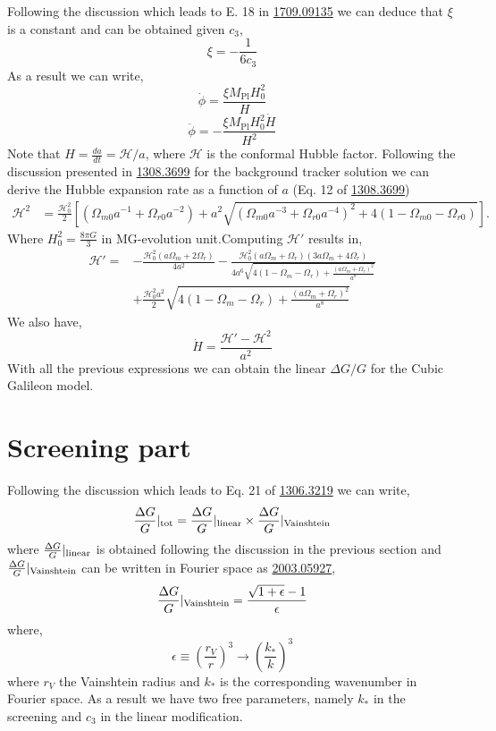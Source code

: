 \documentclass{article}
\def\be{\begin{equation}}
\def\ee{\end{equation}}
\begin{document}
Following the discussion which leads to E. 18 in \href{https://arxiv.org/pdf/1709.09135.pdf} {1709.09135} we can deduce that $\xi$ is a constant and can be obtained given $c_3$,
\be
\xi = -\frac{1}{6 c_3}
\ee
As a result we can write,
\be
\dot{\phi} =   \frac{\xi M_{\mathrm{Pl}} H_0^2}{H} 
\ee
\be
\ddot{\phi} =  - \frac{\xi M_{\mathrm{Pl}} H_0^2 \dot{H}}{H^2} 
\ee
Note that $H = \frac{d a}{dt} = \mathcal{H}/a$, where $\mathcal{H}$ is the conformal Hubble factor. Following the discussion presented in \href{https://arxiv.org/pdf/1308.3699.pdf}{1308.3699} for the background tracker solution we can derive the Hubble expansion rate as a function of $a$ (Eq. 12 of \href{https://arxiv.org/pdf/1308.3699.pdf}{1308.3699})
\begin{equation}
\begin{aligned}
\mathcal{H}^2 &= \frac{\mathcal{H}_0^2}{2}\left[\left(\Omega_{m0} a^{-1} + \Omega_{r0} a^{-2}\right) + a^2 \sqrt{\left(\Omega_{m0} a^{-3} + \Omega_{r0} a^{-4}\right)^2 + 4\left(1 - \Omega_{m0} - \Omega_{r0}\right)}\right].
\end{aligned}
\end{equation}
Where $H_0^2 = \frac{8 \pi G}{3}$ in MG-evolution unit.Computing $\mathcal{H}'$ results in,
\begin{equation}
\begin{aligned}
\mathcal{H}' = & -\frac{\mathcal{H}_0^2 (a \Omega_m + 2 \Omega_r)}{4 a^2} 
 - \frac{\mathcal{H}_0^2(a \Omega_m + \Omega_r) (3 a \Omega_m + 4 \Omega_r)}{4 a^6 \sqrt{4 (1 - \Omega_m - \Omega_r) + \frac{(a \Omega_m + \Omega_r)^2}{a^8}}} \\
& + \frac{\mathcal{H}_0^2 a^2}{2} \sqrt{4 (1 - \Omega_m - \Omega_r) + \frac{(a \Omega_m + \Omega_r)^2}{a^8}}
\end{aligned}
\end{equation}
We also have,
\be
\dot{H} = \frac{\mathcal{H}' - \mathcal{H}^2}{a^2}
\ee
With all the previous expressions we can obtain the linear $\Delta G/G$ for the Cubic Galileon model. 
\section{Screening part}
Following the discussion which leads to Eq. 21 of \href{https://arxiv.org/abs/1306.3219}{1306.3219} we can write,
\be
\frac{\Delta G}{G}|_{\rm tot} =  \frac{\Delta G}{G}|_{\rm linear}  \times \frac{\Delta G}{G}|_{\rm Vainshtein}
\ee
where $\frac{\Delta G}{G}|_{\rm linear}$  is obtained following the discussion in the previous section and  $\frac{\Delta G}{G}|_{\rm Vainshtein}$ can be written in Fourier space as \href{https://arxiv.org/pdf/2003.05927.pdf}{2003.05927},
\be
\frac{\Delta G}{G}|_{\rm Vainshtein} = \frac{\sqrt{1+ \epsilon}-1}{\epsilon}
\ee
where,
 \be
 \epsilon \equiv (\frac{r_V}{r})^3 \to (\frac{k_*}{k})^3
 \ee
where $r_V$ the Vainshtein radius and $k_*$ is the corresponding wavenumber in Fourier space. As a result we have two free parameters, namely $k_*$ in the screening and $c_3$ in the linear modification.
\end{document}
